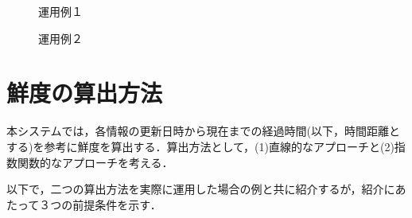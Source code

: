 \begin{figure}[htbp]
  \begin{minipage}{0.5\hsize}
    \begin{center}
    \end{center}
    \caption{運用例１}
  \end{minipage}
  \begin{minipage}{0.5\hsize}
    \begin{center}
    \end{center}
    \caption{運用例２}
  \end{minipage}
\end{figure}

\section{鮮度の算出方法}
\label{sec:imp_calculation}

本システムでは，各情報の更新日時から現在までの経過時間(以下，時間距離とする)を参考に鮮度を算出する．算出方法として，(1)直線的なアプローチと(2)指数関数的なアプローチを考える．

以下で，二つの算出方法を実際に運用した場合の例と共に紹介するが，紹介にあたって３つの前提条件を示す．


